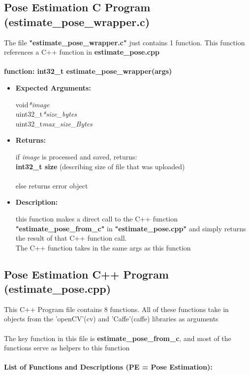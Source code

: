 \documentclass{scrreprt}
\begin{document}
\subsection{Pose Estimation C Program (estimate\_pose\_wrapper.c)}
The file \textbf{"estimate\_pose\_wrapper.c"} just contains 1 function. This function references a C++ function in \textbf{estimate\_pose.cpp}
\\\\
\textbf{function: int32\_t estimate\_pose\_wrapper(args)}
\begin{itemize}
    \item \textbf{Expected Arguments:}

    void\quad\textit{*image}
    \\
    uint32\_t\quad\textit{*size\_bytes}
    \\
    uint32\_t\quad\textit{max\_size\_Bytes}

    \item\quad\textbf{Returns:}

    if \textit{image} is processed and saved, returns:\\\textbf{int32\_t size}
    (describing size of file that was uploaded)
    \\\\
    else returns error object

    \item \textbf{Description:}

    this function makes a direct call to the C++ function \textbf{"estimate\_pose\_from\_c"} in \textbf{"estimate\_pose.cpp"} and simply returns the result of that C++ function call.
    \\
    The C++ function takes in the same args as this function
\end{itemize}

\subsection{Pose Estimation C++ Program (estimate\_pose.cpp)}

This C++ Program file contains 8 functions. All of these functions take in objects from the 'openCV'(cv) and 'Caffe'(caffe) libraries as arguments
\\\\
The key function in this file is \textbf{estimate\_pose\_from\_c}, and most of the functions serve as helpers to this function
\\\\
\textbf{List of Functions and Descriptions (PE = Pose Estimation):}
\\
\end{document}
